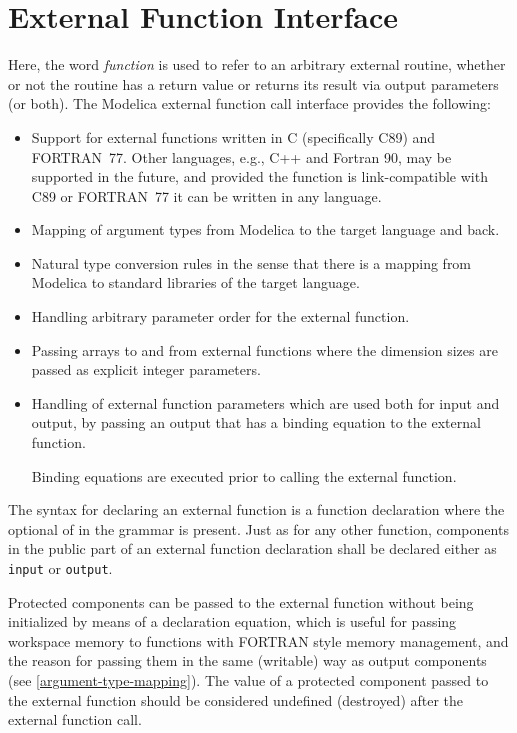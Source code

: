 \section{External Function Interface}\label{external-function-interface}

Here, the word \emph{function} is used to refer to an arbitrary external routine, whether or not the routine has a return value or returns its result via output parameters (or both).
The Modelica external function call interface provides the following:
\begin{itemize}
\item
  Support for external functions written in C (specifically C89) and FORTRAN~77.
  Other languages, e.g., C++ and Fortran 90, may be supported in the future, and provided the function is link-compatible with C89 or FORTRAN~77 it can be written in any language.
\item
  Mapping of argument types from Modelica to the target language and back.
\item
  Natural type conversion rules in the sense that there is a mapping from Modelica to standard libraries of the target language.
\item
  Handling arbitrary parameter order for the external function.
\item
  Passing arrays to and from external functions where the dimension sizes are passed as explicit integer parameters.
\item
  Handling of external function parameters which are used both for input and output, by passing an output that has a binding equation to the external function.
  \begin{nonnormative}
  Binding equations are executed prior to calling the external function.
  \end{nonnormative}
\end{itemize}

The syntax for declaring an external function is a function declaration where the optional  of  in the grammar is present.
Just as for any other function, components in the public part of an external function declaration shall be declared either as {\lstinline!input!} or {\lstinline!output!}.

Protected components can be passed to the external function without being initialized by means of a declaration equation, which is useful for passing workspace memory to functions with FORTRAN style memory management, and the reason for passing them in the same (writable) way as output components (see \cref{argument-type-mapping}).
The value of a protected component passed to the external function should be considered undefined (destroyed) after the external function call.

